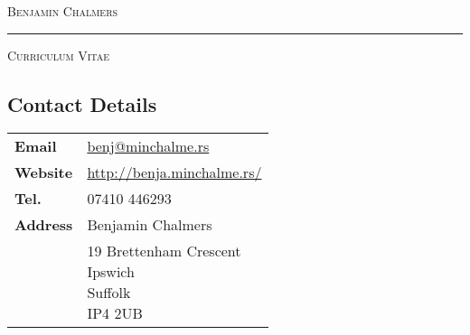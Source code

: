 \documentclass[9pt,a4paper]{article}
\begin{document}
\begin{center}

  \textsc{\Huge{Benjamin Chalmers}}
  \vspace{0.3cm}

  \noindent\rule{0.8\textwidth}{0.4pt}
  \vspace{0.3cm}

  \textsc{\large{Curriculum Vitae}}
  \vspace{0.2cm}

\end{center}
\begin{multicols*}{2}
  \section*{Contact Details} 
\begin{center}
  \begin{tabular}{p{2cm}p{6cm}}
    \textbf{Email}&\href{mailto:benj@minchalme.rs}{benj@minchalme.rs}\\
    \textbf{Website}&\href{http://benja.minchalme.rs/}{http://benja.minchalme.rs/}\\
    \textbf{Tel.}&07410 446293\\
    \textbf{Address}&Benjamin Chalmers\\
    &\parbox{5cm}{19 Brettenham Crescent\\Ipswich\\Suffolk\\IP4 2UB}\\
  \end{tabular}
\end{center}


\end{multicols*}
\end{document}
